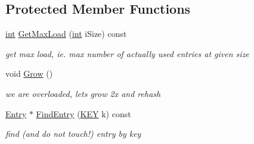 \subsection*{Protected Member Functions}
\begin{DoxyCompactItemize}
\item 
\hyperlink{sphinxexpr_8cpp_a4a26e8f9cb8b736e0c4cbf4d16de985e}{int} \hyperlink{classCSphHash_af3af7b7209955d0514ad44007282287e}{Get\-Max\-Load} (\hyperlink{sphinxexpr_8cpp_a4a26e8f9cb8b736e0c4cbf4d16de985e}{int} i\-Size) const 
\begin{DoxyCompactList}\small\item\em get max load, ie. max number of actually used entries at given size \end{DoxyCompactList}\item 
void \hyperlink{classCSphHash_a036a8a1b5a996b003dcfe7688e7d247d}{Grow} ()
\begin{DoxyCompactList}\small\item\em we are overloaded, lets grow 2x and rehash \end{DoxyCompactList}\item 
\hyperlink{structCSphHash_1_1Entry}{Entry} $\ast$ \hyperlink{classCSphHash_a268b6e72c4d10209c36926ec4936d74e}{Find\-Entry} (\hyperlink{classCSphHash_a59a1412d2e0498b2a7417c7adf5d7041}{K\-E\-Y} k) const 
\begin{DoxyCompactList}\small\item\em find (and do not touch!) entry by key \end{DoxyCompactList}\end{DoxyCompactItemize}
